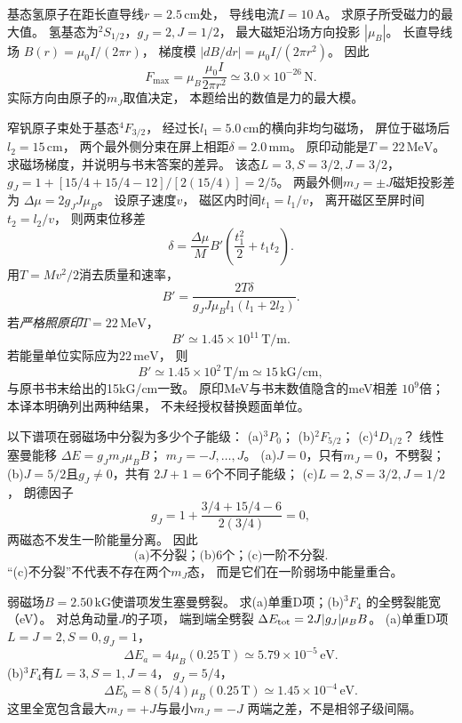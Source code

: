 基态氢原子在距长直导线$r=2.5\,\mathrm{cm}$处，
导线电流$I=10\,\mathrm A$。
求原子所受磁力的最大值。
\exsolution
氢基态为\({}^{2}S_{1/2}\)，$g_J=2,J=1/2$，
最大磁矩沿场方向投影
$|\mu_B|$。
长直导线场
$B(r)=\mu_0I/(2\pi r)$，
梯度模
$|dB/dr|=\mu_0I/(2\pi r^2)$。
因此
\[
 \boxed{F_{\max}=\mu_B\frac{\mu_0 I}{2\pi r^2}
 \simeq3.0\times10^{-26}\,\mathrm N}.
\]
\excheck 实际方向由原子的$m_J$取值决定，
本题给出的数值是力的最大模。

窄钒原子束处于基态\({}^{4}F_{3/2}\)，
经过长$l_1=5.0\,\mathrm{cm}$的横向非均匀磁场，
屏位于磁场后$l_2=15\,\mathrm{cm}$，
两个最外侧分束在屏上相距$\delta=2.0\,\mathrm{mm}$。
原印动能是$T=22\,\mathrm{MeV}$。
求磁场梯度，并说明与书末答案的差异。
\exsolution
该态$L=3,S=3/2,J=3/2$，
$g_J=1+[15/4+15/4-12]/[2(15/4)]=2/5$。
两最外侧$m_J=\pm J$磁矩投影差为
$\Delta\mu=2g_JJ\mu_B$。
设原子速度$v$，
磁区内时间$t_1=l_1/v$，
离开磁区至屏时间$t_2=l_2/v$，
则两束位移差
\[
 \delta=\frac{\Delta\mu}{M}B'
 \left(\frac{t_1^2}2+t_1t_2\right).
\]
用$T=Mv^2/2$消去质量和速率，
\[
 \boxed{B'=\frac{2T\delta}
 {g_JJ\mu_B l_1(l_1+2l_2)}}.
\]
若\emph{严格照原印}$T=22\,\mathrm{MeV}$，
\[
 \boxed{B'\simeq1.45\times10^{11}\,\mathrm{T/m}}.
\]
若能量单位实际应为$22\,\mathrm{meV}$，
则
\[
 \boxed{B'\simeq1.45\times10^2\,\mathrm{T/m}
 \simeq15\,\mathrm{kG/cm}},
\]
与原书书末给出的15kG/cm一致。
\excheck 原印MeV与书末数值隐含的meV相差
$10^9$倍；本译本明确列出两种结果，
不未经授权替换题面单位。

以下谱项在弱磁场中分裂为多少个子能级：
(a)\({}^{3}P_0\)；
(b)\({}^{2}F_{5/2}\)；
(c)\({}^{4}D_{1/2}\)？
\exsolution
线性塞曼能移
$\Delta E=g_J m_J\mu_BB$；
$m_J=-J,\ldots,J$。
(a)$J=0$，只有$m_J=0$，不劈裂；
(b)$J=5/2$且$g_J\ne0$，共有
$2J+1=6$个不同子能级；
(c)$L=2,S=3/2,J=1/2$，
朗德因子
\[
 g_J=1+\frac{3/4+15/4-6}{2(3/4)}=0,
\]
两磁态不发生一阶能量分离。
因此
\[
 \boxed{\text{(a)不分裂；(b)6个；(c)一阶不分裂}}.
\]
\excheck “(c)不分裂”不代表不存在两个$m_J$态，
而是它们在一阶弱场中能量重合。

弱磁场$B=2.50\,\mathrm{kG}$使谱项发生塞曼劈裂。
求(a)单重D项；(b)\({}^{3}F_4\)
的全劈裂能宽（eV）。
\exsolution
对总角动量$J$的子项，
端到端全劈裂
$\Delta E_{\rm tot}=2J|g_J|\mu_BB$。
(a)单重D项$L=J=2,S=0,g_J=1$，
\[
 \boxed{\Delta E_a=4\mu_B(0.25\,\mathrm T)
 \simeq5.79\times10^{-5}\,\mathrm{eV}}.
\]
(b)\({}^{3}F_4\)有$L=3,S=1,J=4$，
$g_J=5/4$，
\[
 \boxed{\Delta E_b=8(5/4)\mu_B(0.25\,\mathrm T)
 \simeq1.45\times10^{-4}\,\mathrm{eV}}.
\]
\excheck 这里全宽包含最大$m_J=+J$与最小$m_J=-J$
两端之差，不是相邻子级间隔。

